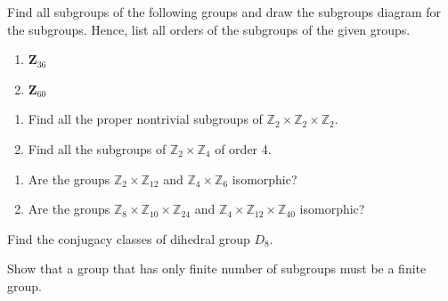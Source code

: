 \begin{mdframed}
    \vspace{0.752cm}
    \begin{Exercise}
        Find all subgroups of the following groups and draw the subgroups diagram for the subgroups. 
        Hence, list all orders of the subgroups of the given groups.
        \begin{enumerate}
            \item $\mathbf{Z}_{36}$
            \item $\mathbf{Z}_{60}$
        \end{enumerate} 
    \end{Exercise}

    \vspace{0.752cm}
    \begin{Exercise}
        \begin{enumerate}
            \item Find all the proper nontrivial subgroups of $\mathbb{Z}_2 \times \mathbb{Z}_2 \times \mathbb{Z}_2$.
            \item Find all the subgroups of $\mathbb{Z}_2 \times \mathbb{Z}_4$ of order 4. 
        \end{enumerate}
    \end{Exercise}

    \vspace{0.752cm}
    \begin{Exercise}
        \begin{enumerate}
            \item Are the groups $\mathbb{Z}_2 \times \mathbb{Z}_{12}$ and $\mathbb{Z}_4 \times \mathbb{Z}_{6}$ isomorphic?
            \item Are the groups $\mathbb{Z}_8 \times \mathbb{Z}_{10} \times \mathbb{Z}_{24}$ and $\mathbb{Z}_4 \times \mathbb{Z}_{12} \times \mathbb{Z}_{40}$ isomorphic?
        \end{enumerate}
    \end{Exercise}

    \vspace{0.752cm}
    \begin{Exercise}
        Find the conjugacy classes of dihedral group $D_8$. 
    \end{Exercise}

    \vspace{0.752cm}
    \begin{Exercise}
        Show that a group that has only finite number of subgroups must be a finite group.
    \end{Exercise}


\end{mdframed}
